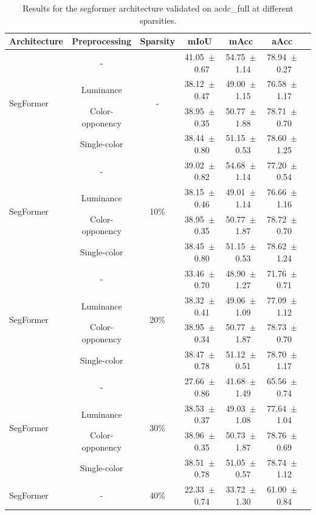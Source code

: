\begin{table}[h]
\centering
\caption{Results for the segformer architecture validated on acdc_full at different sparsities.}
\begin{tabular}{@{}lccc ccc@{}}
\toprule
Architecture & Preprocessing & Sparsity & mIoU & mAcc & aAcc \\
\midrule

\multirow{4}{*}{SegFormer} & - & \multirow{4}{*}{-} & 41.05~$\pm$~0.67 & 54.75~$\pm$~1.14 & 78.94~$\pm$~0.27 \\
& Luminance & & 38.12~$\pm$~0.47 & 49.00~$\pm$~1.15 & 76.58~$\pm$~1.17 \\
& Color-opponency & & 38.95~$\pm$~0.35 & 50.77~$\pm$~1.88 & 78.71~$\pm$~0.70 \\
& Single-color & & 38.44~$\pm$~0.80 & 51.15~$\pm$~0.53 & 78.60~$\pm$~1.25 \\
\midrule
\multirow{4}{*}{SegFormer} & - & \multirow{4}{*}{10\%} & 39.02~$\pm$~0.82 & 54.68~$\pm$~1.14 & 77.20~$\pm$~0.54 \\
& Luminance & & 38.15~$\pm$~0.46 & 49.01~$\pm$~1.14 & 76.66~$\pm$~1.16 \\
& Color-opponency & & 38.95~$\pm$~0.35 & 50.77~$\pm$~1.87 & 78.72~$\pm$~0.70 \\
& Single-color & & 38.45~$\pm$~0.80 & 51.15~$\pm$~0.53 & 78.62~$\pm$~1.24 \\
\midrule
\multirow{4}{*}{SegFormer} & - & \multirow{4}{*}{20\%} & 33.46~$\pm$~0.70 & 48.90~$\pm$~1.27 & 71.76~$\pm$~0.71 \\
& Luminance & & 38.32~$\pm$~0.41 & 49.06~$\pm$~1.09 & 77.09~$\pm$~1.12 \\
& Color-opponency & & 38.95~$\pm$~0.34 & 50.77~$\pm$~1.87 & 78.73~$\pm$~0.70 \\
& Single-color & & 38.47~$\pm$~0.78 & 51.12~$\pm$~0.51 & 78.70~$\pm$~1.17 \\
\midrule
\multirow{4}{*}{SegFormer} & - & \multirow{4}{*}{30\%} & 27.66~$\pm$~0.86 & 41.68~$\pm$~1.49 & 65.56~$\pm$~0.74 \\
& Luminance & & 38.53~$\pm$~0.37 & 49.03~$\pm$~1.08 & 77.64~$\pm$~1.04 \\
& Color-opponency & & 38.96~$\pm$~0.35 & 50.73~$\pm$~1.87 & 78.76~$\pm$~0.69 \\
& Single-color & & 38.51~$\pm$~0.78 & 51.05~$\pm$~0.57 & 78.74~$\pm$~1.12 \\
\midrule
\multirow{4}{*}{SegFormer} & - & \multirow{4}{*}{40\%} & 22.33~$\pm$~0.74 & 33.72~$\pm$~1.30 & 61.00~$\pm$~0.84 \\

\end{tabular}
\end{table}
